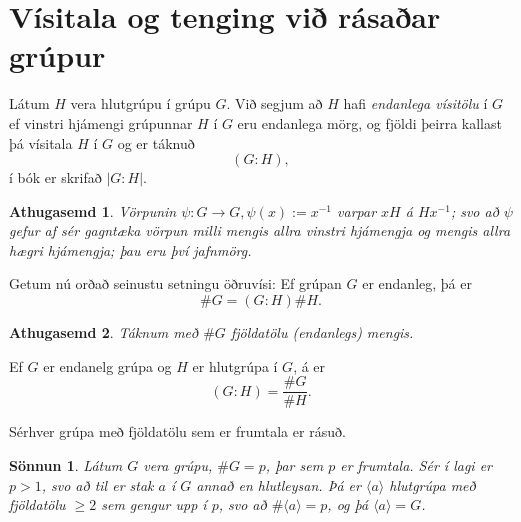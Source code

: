 \documentclass[a4paper,icelandic,11pt]{book}
\theoremstyle{plain}
\newtheorem*{ath}{Athugasemd}
\newtheorem*{sonnun}{Sönnun}
\begin{document}
\section{Vísitala og tenging við rásaðar grúpur}
\begin{skilgr}
  Látum $H$ vera hlutgrúpu í grúpu $G$. Við segjum að $H$ hafi \emph{endanlega
  vísitölu}
  í $G$ ef vinstri hjámengi grúpunnar $H$ í $G$ eru endanlega mörg, og
  fjöldi þeirra kallast þá vísitala $H$ í $G$ og er táknuð
 \[
  (G:H),
 \]
 í bók er skrifað $|G:H|$.
\end{skilgr}
\begin{ath}
  Vörpunin $\psi:G\to G, \psi(x) := x^{-1}$ varpar $xH$ á $Hx^{-1}$; svo að
  $\psi$ gefur af sér gagntæka vörpun milli mengis allra vinstri hjámengja og
  mengis allra hægri hjámengja; þau eru því jafnmörg.
\end{ath}
Getum nú orðað seinustu setningu öðruvísi: Ef grúpan $G$ er endanleg, þá er
\[
 \#G = (G:H)\#H.
\]
\begin{ath}
  Táknum með $\#G$ fjöldatölu (endanlegs) mengis.
\end{ath}
\begin{fylgisetn}
  Ef $G$ er endanelg grúpa og $H$ er hlutgrúpa í $G$, á er
 \[
 (G:H) = \frac{\#G}{\#H}.
 \]
\end{fylgisetn}
\begin{fylgisetn}
  Sérhver grúpa með fjöldatölu sem er frumtala er rásuð.
\end{fylgisetn}

\begin{sonnun}
  Látum $G$ vera grúpu, $\#G = p$, þar sem $p$ er frumtala. Sér í lagi er
  $p > 1$, svo að til er stak $a$ í $G$ annað en hlutleysan. Þá er
  $\langle a \rangle$ hlutgrúpa með fjöldatölu $\ge 2$ sem gengur upp í
  $p$, svo að $\#\langle a \rangle = p$, og þá $\langle a \rangle = G$.
\end{sonnun}
\end{document}

